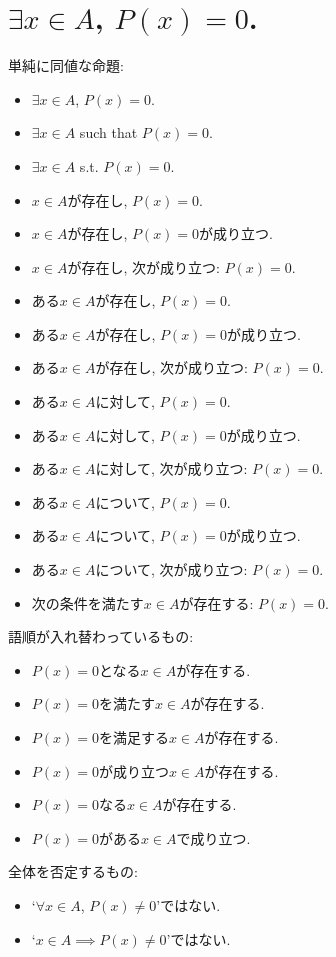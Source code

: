\documentclass[a4paper,12pt,draft]{amsart}
\begin{document}
\section{$\exists x \in A$, $P(x)=0$.}
単純に同値な命題:
\begin{itemize}
\item $\exists x \in A$, $P(x)=0$.
\item $\exists x \in A$ such that $P(x)=0$.
\item $\exists x \in A$ s.t. $P(x)=0$.
\item $x\in A$が存在し, $P(x)=0$.
\item $x\in A$が存在し, $P(x)=0$が成り立つ.
\item $x\in A$が存在し, 次が成り立つ: $P(x)=0$.
\item ある$x\in A$が存在し, $P(x)=0$.
\item ある$x\in A$が存在し, $P(x)=0$が成り立つ.
\item ある$x\in A$が存在し, 次が成り立つ: $P(x)=0$.
\item ある$x\in A$に対して, $P(x)=0$.
\item ある$x\in A$に対して, $P(x)=0$が成り立つ.
\item ある$x\in A$に対して, 次が成り立つ: $P(x)=0$.
\item ある$x\in A$について, $P(x)=0$.
\item ある$x\in A$について, $P(x)=0$が成り立つ.
\item ある$x\in A$について, 次が成り立つ: $P(x)=0$.
\item 次の条件を満たす$x\in A$が存在する: $P(x)=0$.
\end{itemize}
語順が入れ替わっているもの:
\begin{itemize}
\item $P(x)=0$となる$x\in A$が存在する.
\item $P(x)=0$を満たす$x\in A$が存在する.
\item $P(x)=0$を満足する$x\in A$が存在する.
\item $P(x)=0$が成り立つ$x\in A$が存在する.
\item $P(x)=0$なる$x\in A$が存在する.
\item $P(x)=0$がある$x\in A$で成り立つ.
\end{itemize}
全体を否定するもの:
\begin{itemize}
\item `$\forall x \in A$, $P(x)\neq 0$'ではない.
\item `$x \in A\implies P(x)\neq 0$'ではない.
\end{itemize}
\end{document}
